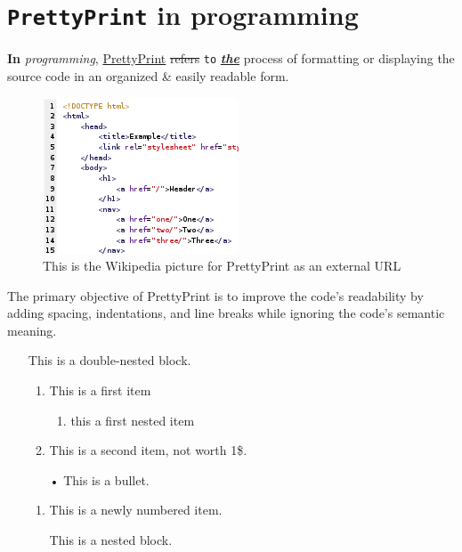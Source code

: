 \documentclass[12pt, a4paper]{article}
\makeatletter
\def\maxwidth#1{\ifdim\Gin@nat@width>#1 #1\else\Gin@nat@width\fi}
\makeatother
\begin{document}
\section{\texttt{PrettyPrint} in programming}
\textbf{In} \textit{programming}, \underline{PrettyPrint} \sout{refers} \texttt{to} \underline{\textbf{\textit{the}}} process of formatting or displaying the source code in an organized \& easily readable form.
 

\begin{figure}[h]
\includegraphics[width=\maxwidth{\linewidth}]{220px-HTML_source_code_example.png}
\centering
\caption{This is the Wikipedia picture for PrettyPrint as an external URL}
\end{figure}
The primary objective of PrettyPrint is to improve the code's readability by adding spacing, indentations, and line breaks while ignoring the code's semantic meaning.

\begin{itemize}
\item[ ] This is a double-nested block.

\begin{enumerate}
\item This is a first item
\begin{enumerate}
\item this a first nested item
\end{enumerate}
\item This is a second item, not worth 1\$.
\end{enumerate}
\begin{itemize}
\item[•] This is a bullet.
\end{itemize}
\begin{enumerate}
\item This is a newly numbered item.
\item[ ] This is a nested block.

\end{enumerate}
\end{itemize}
\end{document}
